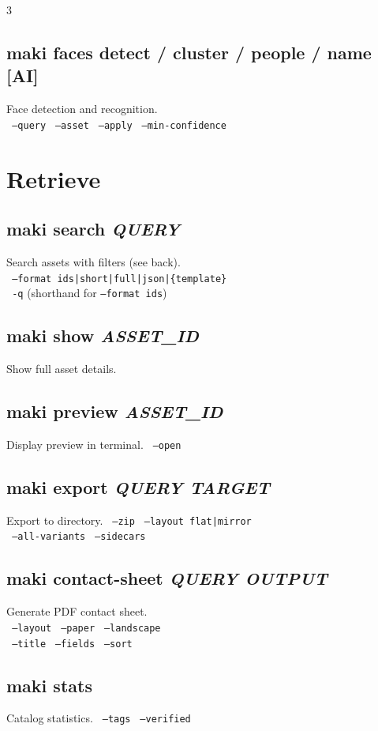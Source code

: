 \documentclass[a4paper,landscape,8pt]{article}
\newcommand{\cmd}[1]{\texttt{\footnotesize #1}}
\newcommand{\opt}[1]{\texttt{\scriptsize\color{maki-stone} #1}}
\newcommand{\ai}{\textcolor{maki-teal}{\scriptsize [AI]}}
\begin{document}
\begin{multicols}{3}
\subsection{maki faces detect / cluster / people / name \ai}
Face detection and recognition. \\
\opt{--query} \opt{--asset} \opt{--apply} \opt{--min-confidence}

\section{Retrieve}

\subsection{maki search \textit{QUERY}}
Search assets with filters (see back). \\
\opt{--format ids|short|full|json|\{template\}} \\
\opt{-q} (shorthand for \cmd{--format ids})

\subsection{maki show \textit{ASSET\_ID}}
Show full asset details.

\subsection{maki preview \textit{ASSET\_ID}}
Display preview in terminal. \opt{--open}

\subsection{maki export \textit{QUERY TARGET}}
Export to directory. \opt{--zip} \opt{--layout flat|mirror} \\
\opt{--all-variants} \opt{--sidecars}

\subsection{maki contact-sheet \textit{QUERY OUTPUT}}
Generate PDF contact sheet. \\
\opt{--layout} \opt{--paper} \opt{--landscape} \\
\opt{--title} \opt{--fields} \opt{--sort}

\subsection{maki stats}
Catalog statistics. \opt{--tags} \opt{--verified}


\end{multicols}
\end{document}
